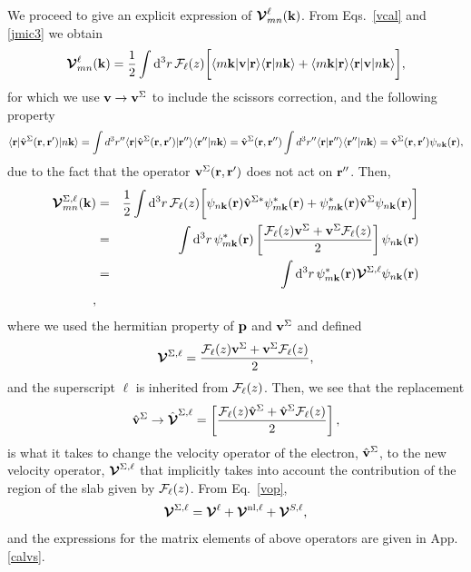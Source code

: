 \documentclass[floatfix,prb,aps,superscriptaddress,11pt,preprint]{revtex4}
\begin{document}
We proceed to give an explicit expression of
$\boldsymbol{\mathcal{\cal V}}^{\ell}_{mn}(\mathbf{k})$.
From
Eqs.~\eqref{vcal} and \eqref{jmic3} we obtain
\begin{equation}\label{intj}
{\boldsymbol{\mathcal{V}}}^{\ell}_{mn}({\mathbf k})=
\frac{1}{2}
\int \mathrm{d}^3 r\,
 {\mathbf{\cal F}}_\ell(z)
\bigg[
\langle m\mathbf{k}|\mathbf{v} | \mathbf{r}\rangle
\langle \mathbf{r} | n \mathbf k \rangle +
\langle m\mathbf{k} | \mathbf{r}\rangle
\langle \mathbf{r} | \mathbf{v} | n \mathbf k \rangle\bigg]
,
\end{equation}  
for which we use $\mathbf{v}\to\mathbf{v}^\Sigma$ to include the scissors correction,
and the following property
\begin{equation}\label{nl.2}
\langle \mathbf{r} | \hat{\mathbf{v}}^\Sigma(\mathbf{r},\mathbf{r}')| n\mathbf{k} \rangle
=\int d^3 r'' \langle \mathbf{r} |\hat{\mathbf{v}}^\Sigma(\mathbf{r},\mathbf{r}')| \mathbf{r}'' \rangle
\langle {\mathbf{r}''} | {n\mathbf{k}} \rangle
=\hat{\mathbf{v}}^\Sigma(\mathbf{r},\mathbf{r}'')
\int d^3 r'' \langle {\mathbf{r}} | {\mathbf{r}''} \rangle
\langle {\mathbf{r}''} | {n\mathbf{k}} \rangle
=\hat{\mathbf{v}}^\Sigma(\mathbf{r},\mathbf{r}')
\psi_{n\mathbf{k}}(\mathbf{r})
,
\end{equation}
due to the fact that the operator $\mathbf{v}^\Sigma(\mathbf{r},\mathbf{r}')$ does not act on
$\mathbf{r}''$. Then,
\begin{eqnarray}\label{nl.3}
\boldsymbol{\mathcal{\cal V}}^{\Sigma,\ell}_{mn}({\mathbf k})
&=&
\frac{1}{2}
\int \mathrm{d}^3 r\,
 {\mathbf{\cal F}}_\ell(z)
 \bigg[
\psi_{n\mathbf{k}}(\mathbf{r})
\hat{\mathbf{v}}^{\Sigma *}\psi^*_{m\mathbf{k}}(\mathbf{r})
+ 
\psi^*_{m\mathbf{k}}(\mathbf{r})\hat{\mathbf{v}}^\Sigma
\psi_{n\mathbf{k}}(\mathbf{r})
\bigg]
\nonumber\\
&=&
\int \mathrm{d}^3 r\,
\psi^*_{m\mathbf{k}}(\mathbf{r})
\left[\frac{{\mathbf{\cal F}}_\ell(z) \mathbf{v}^\Sigma +
\mathbf{v}^\Sigma {\mathbf{\cal F}}_\ell(z)}{2}\right]
\psi_{n\mathbf{k}}(\mathbf{r})
\nonumber\\
&=&
\int \mathrm{d}^3 r\,
\psi^*_{m\mathbf{k}}(\mathbf{r})
\boldsymbol{\mathcal{\cal V}}^{\Sigma,\ell}
\psi_{n\mathbf{k}}(\mathbf{r})
\nonumber\\
,
\end{eqnarray}
where we used the hermitian property of $\mathbf{p}$ and $\mathbf{v}^\Sigma$ and  defined
\begin{eqnarray}\label{nl.4}
\boldsymbol{\mathcal{\cal V}}^{\Sigma,\ell}
=
\frac{{\mathbf{\cal F}}_\ell(z) \mathbf{v}^\Sigma +
\mathbf{v}^\Sigma {\mathbf{\cal F}}_\ell(z)}{2}
,
\end{eqnarray} 
and the superscript $\ell$ is inherited from ${\mathbf{\cal F}}_\ell(z)$. 
Then,
we see that the replacement
\begin{equation}\label{vcali}
\hat{\mathbf{v}}^\Sigma \to \hat{\boldsymbol{\mathcal{\cal V}}}^{\Sigma,\ell}=\left[\frac{{\mathbf{\cal F}}_\ell(z) \hat{\mathbf{v}}^\Sigma +
\hat{\mathbf{v}}^\Sigma {\mathbf{\cal F}}_\ell(z)}{2}\right],
\end{equation} 
is what it takes to change the
velocity operator of the electron, $\hat{\mathbf{v}}^\Sigma$, to the new velocity
operator, $\boldsymbol{\mathcal{\cal V}}^{\Sigma,\ell}$
 that implicitly takes into account the
contribution of the region of the slab given by ${\mathbf{\cal F}}_\ell(z)$.
From Eq.~\eqref{vop},
\begin{eqnarray}\label{vopii}
\boldsymbol{\mathcal{\cal V}}^{\Sigma,\ell}
=
\boldsymbol{\mathcal{\cal V}}^{\ell}
+
\boldsymbol{\mathcal{\cal V}}^{\mathrm{nl},\ell}
+
\boldsymbol{\mathcal{\cal V}}^{S,\ell}
,
\end{eqnarray}
and the expressions for the matrix elements of above operators
are given in 
App. \ref{calvs}.
\end{document}

